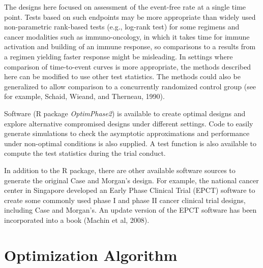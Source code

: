 \documentclass[12pt]{article}
\begin{document}
The designs here focused on assessment of the event-free rate at a single time point. Tests based
on such endpoints may be more appropriate than widely used non-parametric rank-based tests (e.g.,
log-rank test) for some regimens and cancer modalities such as immuno-oncology, in which it takes
time for immune activation and building of an immune response, so comparisons to a results from a
regimen yielding faster response might be misleading.  In settings where comparison of
time-to-event curves is more appropriate, the methods described here can be modified to use other
test statistics.  The methods could also be generalized to allow comparison to a concurrently
randomized control group (see for example, Schaid, Wieand, and Therneau, 1990).

Software (R package {\it OptimPhase2}) is available to create optimal designs and explore
alternative compromised designs under different settings. Code to easily generate simulations to
check the asymptotic approximations and performance under non-optimal conditions is also supplied.
A test function is also available to compute the test statistics during the trial conduct.

In addition to the R package, there are other available software sources to generate the original
Case and Morgan's design. For example, the national cancer center in Singapore developed an Early
Phase Clinical Trial (EPCT) software to create some commonly used phase I and phase II cancer
clinical trial designs, including Case and Morgan's. An update version of the EPCT software has
been incorporated into a book (Machin et al, 2008).


\appendix

\section{Optimization Algorithm}
\label{optsect}
\end{document}
